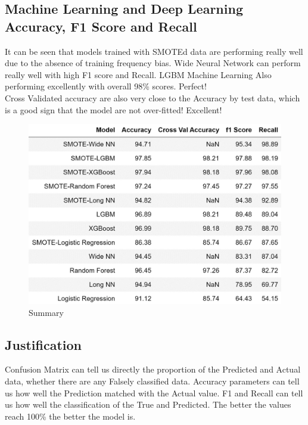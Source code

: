 \documentclass{homeworg}
\begin{document}
\subsection{Machine Learning and Deep Learning Accuracy, F1 Score and Recall}
It can be seen that models trained with SMOTEd data are performing really well due to the absence of training frequency bias. Wide Neural Network can perform really well with high F1 score and Recall. LGBM Machine Learning Also performing excellently with overall 98\% scores. Perfect!\\
Cross Validated accuracy are also very close to the Accuracy by test data, which is a good sign that the model are not over-fitted! Excellent!
\begin{figure}[H]
    \centering
    \includegraphics[scale=0.6]{figure/Summary.jpg}
    \caption{Summary}
    \label{fig:summary}
\end{figure}
\subsection{Justification}
Confusion Matrix can tell us directly the proportion of the Predicted and Actual data, whether there are any Falsely classified data.
Accuracy parameters can tell us how well the Prediction matched with the Actual value. 
F1 and Recall can tell us how well the classification of the True and Predicted. 
The better the values reach 100\% the better the model is.
\end{document}
